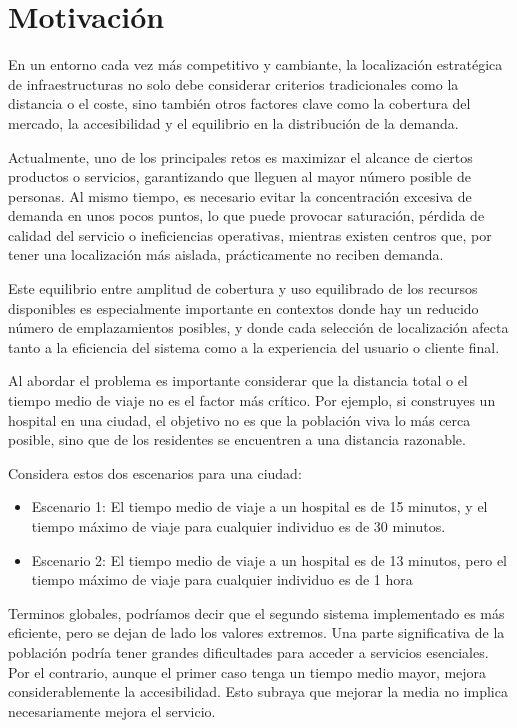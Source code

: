 \documentclass[12pt,a4paper]{book}
\begin{document}
\section{Motivación}
En un entorno cada vez más competitivo y cambiante, la localización estratégica de infraestructuras no solo debe considerar criterios tradicionales como la distancia o el coste, sino también otros factores clave como la cobertura del mercado, la accesibilidad y el equilibrio en la distribución de la demanda.

Actualmente, uno de los principales retos es maximizar el alcance de ciertos productos o servicios, garantizando que lleguen al mayor número posible de personas. Al mismo tiempo, es necesario evitar la concentración excesiva de demanda en unos pocos puntos, lo que puede provocar saturación, pérdida de calidad del servicio o ineficiencias operativas, mientras existen centros que, por tener una localización más aislada, prácticamente no reciben demanda.

Este equilibrio entre amplitud de cobertura y uso equilibrado de los recursos disponibles es especialmente importante en contextos donde hay un reducido número de emplazamientos posibles, y donde cada selección de localización afecta tanto a la eficiencia del sistema como a la experiencia del usuario o cliente final.

Al abordar el problema es importante considerar que la distancia total o el tiempo medio de viaje no es el factor más crítico. Por ejemplo, si construyes un hospital en una ciudad, el objetivo no es que la población viva lo más cerca posible, sino que de
los residentes se encuentren a una distancia razonable. 

Considera estos dos escenarios para una ciudad:
\begin{itemize}
    \item Escenario 1: El tiempo medio de viaje a un hospital es de 15 minutos, y el tiempo máximo de viaje para cualquier individuo es de 30 minutos.
    \item Escenario 2: El tiempo medio de viaje a un hospital es de 13 minutos, pero el tiempo máximo de viaje para cualquier individuo es de 1 hora
\end{itemize} 
Terminos globales, podríamos decir que el segundo sistema implementado es más eficiente, pero se dejan de lado los valores extremos. Una parte significativa de la población podría tener grandes dificultades para acceder a servicios esenciales. Por el contrario, aunque el primer caso tenga un tiempo medio mayor, mejora considerablemente la accesibilidad. Esto subraya que mejorar la media no implica necesariamente mejora el servicio.
\end{document}
